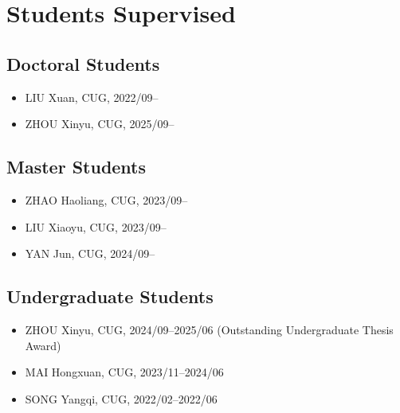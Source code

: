 \section{Students Supervised}

\subsection{Doctoral Students}
\begin{itemize}
\item LIU Xuan, CUG, 2022/09--
\item ZHOU Xinyu, CUG, 2025/09--
\end{itemize}

\subsection{Master Students}
\begin{itemize}
\item ZHAO Haoliang, CUG, 2023/09--
\item LIU Xiaoyu, CUG, 2023/09--
\item YAN Jun, CUG, 2024/09--
\end{itemize}

\subsection{Undergraduate Students}
\begin{itemize}
\item ZHOU Xinyu, CUG, 2024/09--2025/06 (Outstanding Undergraduate Thesis Award)
\item MAI Hongxuan, CUG, 2023/11--2024/06
\item SONG Yangqi, CUG, 2022/02--2022/06
\end{itemize}
